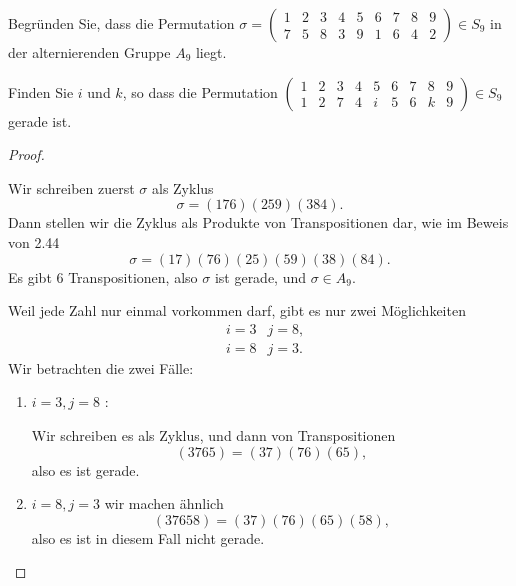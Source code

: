 \begin{Problem}
	\begin{parts}
		\item Begr\"{u}nden Sie, dass die Permutation $\sigma=\begin{pmatrix} 1 & 2 & 3 & 4 & 5 & 6 & 7 & 8 & 9 \\ 7 & 5 & 8 & 3 & 9 & 1 & 6 & 4 & 2 \end{pmatrix} \in S_9$ in der alternierenden Gruppe $A_9$ liegt.
		\item Finden Sie $i$ und $k$, so dass die Permutation $\begin{pmatrix}  1 & 2 & 3 & 4 & 5 & 6 & 7 & 8 & 9\\ 1 & 2 & 7 & 4 & i & 5 & 6 & k & 9 \end{pmatrix} \in S_9$ gerade ist.
		\end{parts}
\end{Problem}

\begin{proof}
	\begin{parts}
	\item Wir schreiben zuerst $\sigma$ als Zyklus
	\[
	\sigma=(176)(259)(384)
	.\] 
	Dann stellen wir die Zyklus als Produkte von Transpositionen dar, wie im Beweis von 2.44
	\[
	\sigma=(17)(76)(25)(59)(38)(84)
	.\]
	Es gibt $6$ Transpositionen, also $\sigma$ ist gerade, und $\sigma\in A_9$.
\item Weil jede Zahl nur einmal vorkommen darf, gibt es nur zwei M\"{o}glichkeiten
	\begin{align*}
	& i=3 & j=8,\\
	& i=8 & j =3.
	\end{align*} 
	Wir betrachten die zwei F\"{a}lle:
	\begin{enumerate}[label=(\roman*)]
		\item $i=3, j=8$ :

			Wir schreiben es als Zyklus, und dann von Transpositionen
			\[
				(3765)=(37)(76)(65)
			,\]
			also es ist gerade.
		\item $i=8,j=3$ wir machen ähnlich
			\[
				(37658)=(37)(76)(65)(58)
			,\] 
			also es ist in diesem Fall nicht gerade.\qedhere
	\end{enumerate}
\end{parts}
\end{proof}

